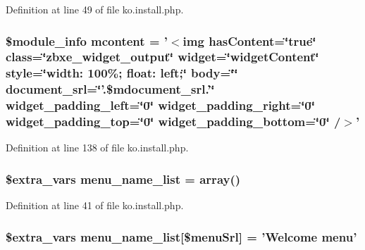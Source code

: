 Definition at line 49 of file ko.\+install.\+php.

\hypertarget{ko_8install_8php_a9da4bb6e77356bb68ae0e05dbd9f5e2f}{
\subsubsection[{mcontent}]{\setlength{\rightskip}{0pt plus 5cm}\$module\+\_\+info {\bf mcontent} = '$<$img has\+Content=\char`\"{}true\char`\"{} class=\char`\"{}zbxe\+\_\+widget\+\_\+output\char`\"{} widget=\char`\"{}widget\+Content\char`\"{} style=\char`\"{}width\+: 100\%; float\+: left;\char`\"{} body=\char`\"{}\char`\"{} document\+\_\+srl=\char`\"{}'.\$mdocument\+\_\+srl.'\char`\"{} widget\+\_\+padding\+\_\+left=\char`\"{}0\char`\"{} widget\+\_\+padding\+\_\+right=\char`\"{}0\char`\"{} widget\+\_\+padding\+\_\+top=\char`\"{}0\char`\"{} widget\+\_\+padding\+\_\+bottom=\char`\"{}0\char`\"{} /$>$'}}\label{ko_8install_8php_a9da4bb6e77356bb68ae0e05dbd9f5e2f}


Definition at line 138 of file ko.\+install.\+php.

\hypertarget{ko_8install_8php_a9223cf55eb6ff5239c0396968e619fbe}{
\subsubsection[{menu\+\_\+name\+\_\+list}]{\setlength{\rightskip}{0pt plus 5cm}\${\bf extra\+\_\+vars} menu\+\_\+name\+\_\+list = array()}}\label{ko_8install_8php_a9223cf55eb6ff5239c0396968e619fbe}


Definition at line 41 of file ko.\+install.\+php.

\hypertarget{ko_8install_8php_aab93e295f18667faa1458cf574553e1f}{
\subsubsection[{menu\+\_\+name\+\_\+list}]{\setlength{\rightskip}{0pt plus 5cm}\${\bf extra\+\_\+vars} menu\+\_\+name\+\_\+list\mbox{[}\$menu\+Srl\mbox{]} = 'Welcome {\bf menu}'}}\label{ko_8install_8php_aab93e295f18667faa1458cf574553e1f}


